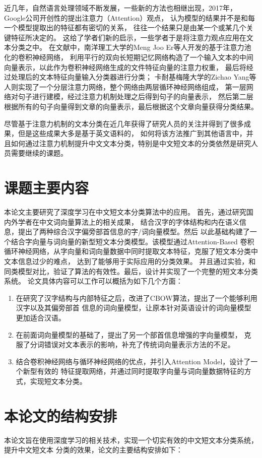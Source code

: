 近几年，自然语言处理领域不断发展，一些新的方法也相继出现，2017年，
Google公司开创性的提出注意力（Attention）观点，
认为模型的结果并不是和每一个模型提取出的特征都有密切的关系，
往往一个结果只是由某一个或某几个关键特征所决定的。
这给了学者们新的启示，一些学者于是将注意力观点应用在文本分类之中。
在文献\cite{er2016attention}中，南洋理工大学的Meng Joo Er等人开发的基于注意力池化的卷积神经网络，
利用平行的双向长短期记忆网络构造了一个输入文本的中间向量表示，以此作为卷积神经网络生成的文件特征向量的注意力权重，
最后将经过处理后的文本特征向量输入分类器进行分类；
卡耐基梅隆大学的Zichao Yang等人则实现了一个分层注意力网络，整个网络由两层循环神经网络组成，
第一层网络对句子进行建模，经过注意力机制处理之后得到句子的向量表示，
然后第二层根据所有的句子向量得到文章的向量表示，最后根据这个文章向量获得分类结果。

尽管基于注意力机制的文本分类在近几年获得了研究人员的关注并得到了很多成果，但是这些成果大多是基于英文语料的，
如何将该方法推广到其他语言中，并且如何通过注意力机制提升中文文本分类，特别是中文短文本的分类依然是研究人员需要继续的课题。
\section{课题主要内容}
本论文主要研究了深度学习在中文短文本分类算法中的应用。
首先，通过研究国内外学者在中文词向量算法上的相关成果，
结合汉字的字体结构和内在语义信息，提出了两种综合汉字偏旁部首信息的字/词向量模型。然后
以此基础构建了一个结合字向量与词向量的新型短文本分类模型。该模型通过Attention-Based
卷积循环神经网络，从字向量和词向量数据中同时提取文本特征，克服了短文本分类中文本信息过少的难点，
达到了能够用于实际应用的分类效果。
并且通过实验，和同类模型对比，验证了算法的有效性。最后，设计并实现了一个完整的短文本分类系统。
论文具体内容可以工作可以概括为如下几个方面：
\begin{enumerate}
    \item 在研究了汉字结构与内部特征之后，改进了CBOW算法，提出了一个能够利用汉字以及其偏旁部首
    信息的词向量模型，让原本针对英语设计的词向量模型更加适合汉语。
    \item 在前面词向量模型的基础了，提出了另一个部首信息增强的字向量模型，
    克服了分词错误对文本表示的影响，补充了传统词向量表示方法的不足。
    \item 结合卷积神经网络与循环神经网络的优点，并引入Attention Model，设计了一个新型有效的
    特征提取网络，并通过同时提取字向量与词向量数据特征的方式，实现短文本分类。
\end{enumerate}
\section{本论文的结构安排}
本论文旨在使用深度学习的相关技术，实现一个切实有效的中文短文本分类系统，提升中文短文本
分类的效果，论文的主要结构安排如下：

